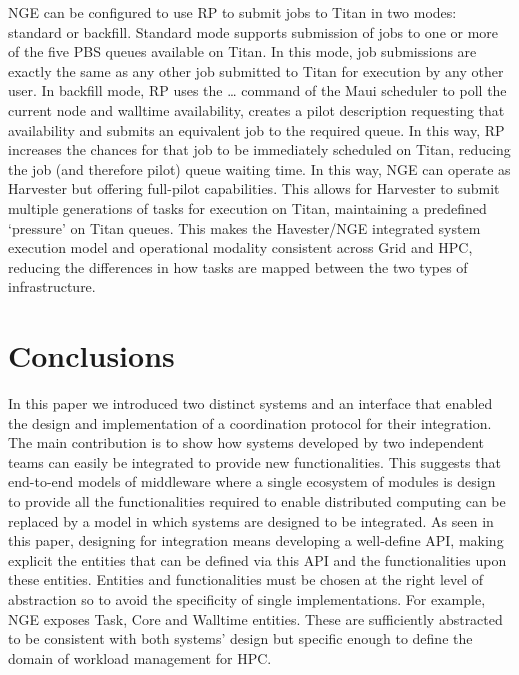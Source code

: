 \documentclass{webofc}
\begin{document}
NGE can be configured to use RP to submit jobs to Titan in two modes:
standard or backfill. Standard mode supports submission of jobs to one or
more of the five PBS queues available on Titan. In this mode, job submissions
are exactly the same as any other job submitted to Titan for execution by any
other user. In backfill mode, RP uses the … command of the Maui scheduler to
poll the current node and walltime availability, creates a pilot description
requesting that availability and submits an equivalent job to the required
queue. In this way, RP increases the chances for that job to be immediately
scheduled on Titan, reducing the job (and therefore pilot) queue waiting
time. In this way, NGE can operate as Harvester but offering full-pilot
capabilities. This allows for Harvester to submit multiple generations of
tasks for execution on Titan, maintaining a predefined ‘pressure’ on Titan
queues. This makes the Havester/NGE integrated system execution model and
operational modality consistent across Grid and HPC, reducing the differences
in how tasks are mapped between the two types of infrastructure.


\section{Conclusions}

In this paper we introduced two distinct systems and an interface that
enabled the design and implementation of a coordination protocol for their
integration. The main contribution is to show how systems developed by two
independent teams can easily be integrated to provide new functionalities.
This suggests that end-to-end models of middleware where a single ecosystem
of modules is design to provide all the functionalities required to enable
distributed computing can be replaced by a model in which systems are
designed to be integrated. As seen in this paper, designing for integration
means developing a well-define API, making explicit the entities that can be
defined via this API and the functionalities upon these entities. Entities
and functionalities must be chosen at the right level of abstraction so to
avoid the specificity of single implementations. For example, NGE exposes
Task, Core and Walltime entities. These are sufficiently abstracted to be
consistent with both systems’ design but specific enough to define the domain
of workload management for HPC.
\end{document}
